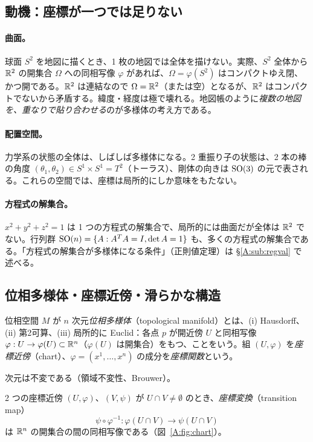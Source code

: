 \subsection{動機：座標が一つでは足りない}
\paragraph{曲面。}球面 $S^2$ を地図に描くとき、1 枚の地図では全体を描けない。実際、$S^2$ 全体から $\mathbb R^2$ の開集合 $\Omega$ への同相写像 $\varphi$ があれば、$\Omega=\varphi(S^2)$ はコンパクトゆえ閉、かつ開である。$\mathbb R^2$ は連結なので $\Omega=\mathbb R^2$（または空）となるが、$\mathbb R^2$ はコンパクトでないから矛盾する。緯度・経度は極で壊れる。地図帳のように\emph{複数の地図を、重なりで貼り合わせる}のが多様体の考え方である。

\paragraph{配置空間。}力学系の状態の全体は、しばしば多様体になる。2 重振り子の状態は、2 本の棒の角度 $(\theta_1,\theta_2)\in S^1\times S^1=T^2$（トーラス）、剛体の向きは $\mathrm{SO}(3)$ の元で表される。これらの空間では、座標は局所的にしか意味をもたない。

\paragraph{方程式の解集合。}$x^2+y^2+z^2=1$ は 1 つの方程式の解集合で、局所的には曲面だが全体は $\mathbb R^2$ でない。行列群 $\mathrm{SO}(n)=\{A:A^TA=I,\det A=1\}$ も、多くの方程式の解集合である。「方程式の解集合が多様体になる条件」（正則値定理）は §\ref{A:sub:regval} で述べる。

\subsection{位相多様体・座標近傍・滑らかな構造}
\begin{defn}[位相多様体]
位相空間 $M$ が $n$ 次元\emph{位相多様体}（topological manifold）とは、(i) Hausdorff、(ii) 第2可算、(iii) 局所的に Euclid：各点 $p$ が開近傍 $U$ と同相写像 $\varphi:U\to\varphi(U)\subset\mathbb R^n$（$\varphi(U)$ は開集合）をもつ、ことをいう。組 $(U,\varphi)$ を\emph{座標近傍}（chart）、$\varphi=(x^1,\dots,x^n)$ の成分を\emph{座標関数}という。
\end{defn}
次元は不変である（領域不変性、Brouwer\tC）。

2 つの座標近傍 $(U,\varphi)$、$(V,\psi)$ が $U\cap V\ne\emptyset$ のとき、\emph{座標変換}（transition map）
\[
\psi\circ\varphi^{-1}:\varphi(U\cap V)\to\psi(U\cap V)
\]
は $\mathbb R^n$ の開集合の間の同相写像である（図~\ref{A:fig:chart}）。

